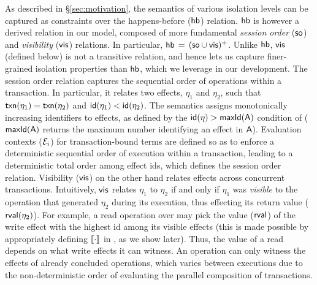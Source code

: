 As described in \S\ref{sec:motivation}, the semantics of various
isolation levels can be captured as constraints over the
happens-before ($\textsf{hb}$) relation. $\textsf{hb}$ is however a derived relation
in our model, composed of more fundamental \emph{session order}
($\textsf{so}$) and \emph{visibility} ($\textsf{vis}$) relations. In particular,
$\textsf{hb} \,=\, (\textsf{so} \cup \textsf{vis})^{+}$. Unlike $\textsf{hb}$, $\textsf{vis}$ (defined
below) is not a transitive relation, and hence lets us capture
finer-grained isolation properties than $\textsf{hb}$, which we leverage in
our development.  The session order relation captures the sequential
order of operations within a transaction. In particular, it relates
two effects, $\eta_1$ and $\eta_2$, such that $\textsf{txn}(\eta_1) =
\textsf{txn}(\eta_2)$ and $\textsf{id}(\eta_1) < \textsf{id}(\eta_2)$.  The semantics assigns
monotonically increasing identifiers to effects, as defined by the
$\textsf{id}(\eta) > \textsf{maxId}(\textsf{A})$ condition of  ($\textsf{maxId}(\textsf{A})$
returns the maximum number identifying an effect in $\textsf{A}$). Evaluation
contexts ($\mathcal{E}_i$) for transaction-bound terms are defined so as to
enforce a deterministic sequential order of execution within a
transaction, leading to a deterministic total order among effect ids,
which defines the session order relation. Visibility ($\textsf{vis}$) on the
other hand relates effects across concurrent transactions.
Intuitively, $\textsf{vis}$ relates $\eta_1$ to $\eta_2$ if and only if
$\eta_1$ was \emph{visible} to the operation that generated $\eta_2$
during its execution, thus effecting its return value
($\textsf{rval}(\eta_2)$). For example, a read operation over  may pick
the value ($\textsf{rval}$) of the write effect with the highest id among its
visible effects (this is made possible by appropriately defining
$\llbracket \cdot \rrbracket$ in , as we show later). Thus, the
value of a read depends on what write effects it can witness. An
operation can only witness the effects of already concluded
operations, which varies between executions due to the
non-deterministic order of evaluating the parallel composition of
transactions.

